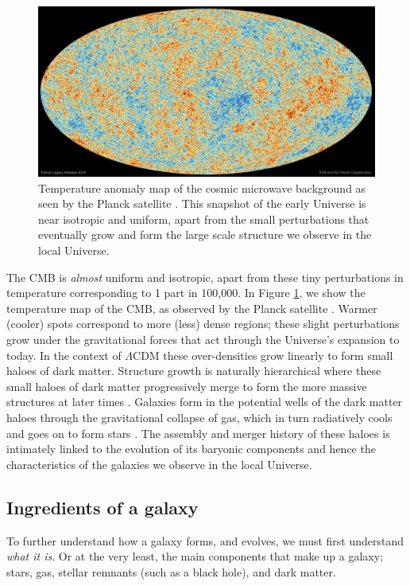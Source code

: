 \begin{figure}
	\includegraphics[width=\linewidth]{thesis/latex/introduction/planck_cmb_2018.jpg}
    \caption{Temperature anomaly map of the cosmic microwave background as seen by the Planck satellite \citep{planck2018i}. This snapshot of the early Universe is near isotropic and uniform, apart from the small perturbations that eventually grow and form the large scale structure we observe in the local Universe.}
    \label{fig:cmb_planck}
\end{figure}

The CMB is \textit{almost} uniform and isotropic, apart from these tiny perturbations in temperature corresponding to 1 part in 100,000. In Figure \ref{fig:cmb_planck}, we show the temperature map of the CMB, as observed by the Planck satellite \citep{planck2018i}. Warmer (cooler) spots correspond to more (less) dense regions; these slight perturbations grow under the gravitational forces that act through the Universe's expansion to today. In the context of $\Lambda$CDM these over-densities grow linearly to form small haloes of dark matter. Structure growth is naturally hierarchical where these small haloes of dark matter progressively merge to form the more massive structures at later times \citep{press1974}. Galaxies form in the potential wells of the dark matter haloes through the gravitational collapse of gas, which in turn radiatively cools and goes on to form stars \citep{white1978}. The assembly and merger history of these haloes is intimately linked to the evolution of its baryonic components and hence the characteristics of the galaxies we observe in the local Universe.

\subsection{Ingredients of a galaxy}
To further understand how a galaxy forms, and evolves, we must first understand \textit{what it is}. Or at the very least, the main components that make up a galaxy; stars, gas, stellar remnants (such as a black hole), and dark matter. 

